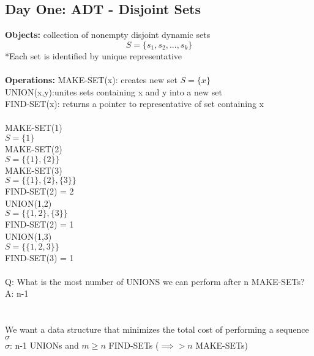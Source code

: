 \documentclass{article}
\begin{document}
	\subsection{Day One: ADT - Disjoint Sets\\}
	\textbf{Objects:} collection of nonempty disjoint dynamic sets $$S= \{s_1, s_2, ..., s_k\}$$
	*Each set is identified by unique representative\\\\
	\textbf{Operations: }MAKE-SET(x): creates new set $S=\{x\}$\\
	UNION(x,y):unites sets containing x and y into a new set\\
	FIND-SET(x): returns a pointer to representative of set containing x\\\\
	MAKE-SET(1)\\
	$S=\{1\}$\\
	MAKE-SET(2)\\
	$S=\{\{1\},\{2\}\}$\\
	MAKE-SET(3)\\
	$S=\{\{1\},\{2\},\{3\}\}$\\
	FIND-SET(2) = 2\\
	UNION(1,2)\\
	$S=\{\{1,2\},\{3\}\}$\\
	FIND-SET(2) = 1\\
	UNION(1,3)\\
	$S=\{\{1,2,3\}\}$\\
	FIND-SET(3) = 1\\\\
	Q: What is the most number of UNIONS we can perform after n MAKE-SETs?\\
	A: n-1\\\\\\
	We want a data structure that minimizes the total cost of performing a sequence $\sigma$\\
	$\sigma$: n-1 UNIONs and $m\ge n$ FIND-SETs ($\implies > n$ MAKE-SETs)\\\\
\end{document}
